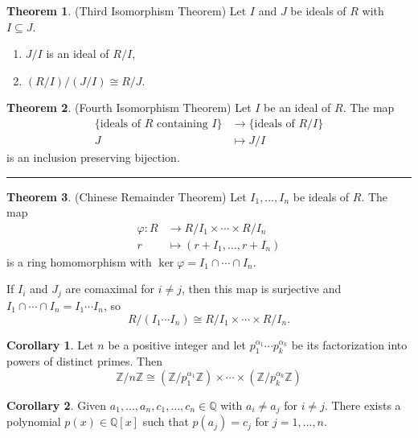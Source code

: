 \documentclass[12pt]{article}
\newcommand{\sepline}{\rule{\textwidth}{0.4pt}}
\theoremstyle{definition}
\newtheorem{theorem}{Theorem}
\newtheorem{corollary}{Corollary}
\newcommand{\Z}{\mathbb{Z}}
\newcommand{\Q}{\mathbb{Q}}
\renewcommand{\phi}{\varphi}
\newcommand{\<}{\left\langle}
\renewcommand{\>}{\right\rangle}
\newcommand{\isom}{\cong}
\begin{document}
\begin{theorem}(Third Isomorphism Theorem)
    Let $I$ and $J$ be ideals of $R$ with $I \subseteq J$.
    \begin{enumerate}
        \item $J/I$ is an ideal of $R/I$,
        \item $(R/I)/(J/I) \isom R/J$.
    \end{enumerate}
\end{theorem}

\begin{theorem}(Fourth Isomorphism Theorem)
    Let $I$ be an ideal of $R$. The map
    \begin{align*}
        \{\text{ideals of $R$ containing $I$}\} &\to \{\text{ideals of $R/I$}\} \\
        J &\mapsto J/I
    \end{align*}
    is an inclusion preserving bijection.
\end{theorem}

\sepline

\begin{theorem}(Chinese Remainder Theorem)
    Let $I_1, \dots, I_n$ be ideals of $R$. The map
    \begin{align*}
        \phi : R &\to R/I_1 \times \cdots \times R/I_n \\
            r &\mapsto (r+I_1, \dots, r+I_n)
    \end{align*}
    is a ring homomorphism with $\ker \phi = I_1 \cap \cdots \cap I_n$.
    
    If $I_i$ and $J_j$ are comaximal for $i \ne j$, then this map is surjective and $I_1 \cap \cdots \cap I_n = I_1 \cdots I_n$, so
    \[
        R/(I_1 \cdots I_n) \isom R/I_1 \times \cdots \times R/I_n.
    \]
\end{theorem}

\begin{corollary}
    Let $n$ be a positive integer and let $p_1^{\alpha_1} \cdots p_k^{\alpha_k}$ be its factorization into powers of distinct primes. Then
    \[
        \Z/n\Z \isom (\Z/p_1^{\alpha_1}\Z) \times \cdots \times (\Z/p_k^{\alpha_k}\Z)
    \]
\end{corollary}

\begin{corollary}
    Given $a_1, \dots, a_n, c_1, \dots, c_n \in \Q$ with $a_i \ne a_j$ for $i \ne j$. There exists a polynomial $p(x) \in \Q[x]$ such that $p(a_j) = c_j$ for $j = 1, \dots, n$.
\end{corollary}
\end{document}
